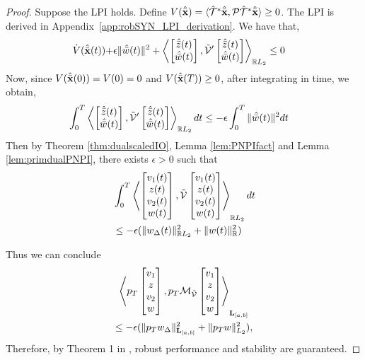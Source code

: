 \begin{proof}

	Suppose the LPI holds. Define
	$V(\hat{\bar{\mathbf{x}}}) =
		{\langle\hat{\mathcal{T}}^*\hat{\bar{\mathbf{x}}},
		\mathcal{P}\hat{\mathcal{T}}^*\hat{\bar{\mathbf{x}}}\rangle} \geq 0$.
	{The LPI is derived in Appendix~\ref{app:robSYN_LPI_derivation}.}
	We have that,
	\begin{align*}
		\dot{V}(\hat{\bar{\mathbf{x}}}(t))
			&{+ \epsilon\|\hat{\bar w}(t)\|^2
				+ \left\langle
				\begin{bmatrix}\hat{\bar z}(t)\\ \hat{\bar w}(t)\end{bmatrix},
				\tilde{\mathcal{V}}'\begin{bmatrix}\hat{\bar z}(t)\\ \hat{\bar w}(t)\end{bmatrix}
				\right\rangle_{\mathbb{R} L_2}}
			\leq 0
	\end{align*}
	Now, since $V(\hat{\bar{\mathbf{x}}}(0)) = V(0) = 0$ and
	$V(\hat{\bar{\mathbf{x}}}(T))\geq0$, after integrating in time, we obtain,
	\begin{equation*}
		\begin{aligned}
			&{\int_0^T \left\langle
				\begin{bmatrix}\hat{\bar z}(t)\\ \hat{\bar w}(t)\end{bmatrix},
				\tilde{\mathcal{V}}'\begin{bmatrix}\hat{\bar z}(t)\\ \hat{\bar w}(t)\end{bmatrix}
			\right\rangle_{\mathbb{R} L_2}dt} \leq {-\epsilon\int_0^T\|\hat{\bar w}(t)\|^2dt}
		\end{aligned}
	\end{equation*}
	Then by Theorem \ref{thm:dualscaledIO}, Lemma \ref{lem:PNPIfact} and
	Lemma \ref{lem:primdualPNPI}, {there exists $\epsilon>0$ such that}
	\begin{equation*}
		\begin{aligned}
			&\int_0^T \left\langle
				\begin{bmatrix}v_1(t)\\z(t)\\v_2(t)\\w(t)\end{bmatrix},
				\tilde{\mathcal{V}}\begin{bmatrix}v_1(t)\\z(t)\\v_2(t)\\w(t)\end{bmatrix}
			\right\rangle_{\mathbb{R}L_2}dt \\
			&\leq -{\epsilon}
			(\|{{w}_\Delta}(t)\|^2_{\mathbb{R} L_2}+\| {w}(t)\|^2_{\mathbb{R}})
		\end{aligned}
	\end{equation*}

	Thus we can conclude
	\begin{equation*}
		\begin{gathered}
			\left\langle 
				p_T\begin{bmatrix}v_1\\z\\v_2\\w\end{bmatrix}
			, 
				p_T\mathcal{M}_{\tilde{\mathcal{V}}}\begin{bmatrix}v_1\\z\\v_2\\w\end{bmatrix}
			 \right\rangle_{\mathbf{L}_{[a, b]}} \\
			\leq -{\epsilon}
			(\|p_T{w_\Delta}\|^2_{\mathbf{L}_{[a, b]}}+\|p_T w\|^2_{L_2}),
		\end{gathered}
	\end{equation*}
	Therefore, by Theorem 1 in
	\cite{lenssen2025muanalysissynthesisframeworkpartial}, robust performance
	and stability are guaranteed.
\end{proof}
